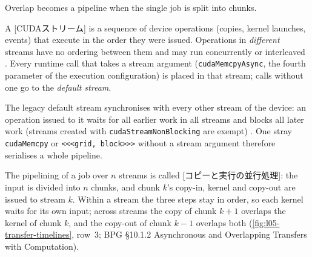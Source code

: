 \documentclass[../main.tex]{subfiles}
\begin{document}
Overlap becomes a pipeline when the single job is split into chunks.

\begin{definition}
  A [CUDAストリーム] is a sequence of device operations
  (copies, kernel launches, events) that execute in the order they were
  issued.  Operations in \emph{different} streams have no ordering
  between them and may run concurrently or interleaved
  \cite{harris2015streams}.  Every runtime call that takes a stream
  argument (\texttt{cudaMemcpyAsync}, the fourth parameter of the
  execution configuration) is placed in that stream; calls without one go
  to the \emph{default stream}.
\end{definition}

The legacy default stream synchronises with every other stream of the
device: an operation issued to it waits for all earlier work in all
streams and blocks all later work (streams created with
\texttt{cudaStreamNonBlocking} are exempt) \cite{harris2015streams}.  One stray
\texttt{cudaMemcpy} or \texttt{<<<grid, block>>>} without a stream
argument therefore serialises a whole pipeline.

\begin{definition}
  The pipelining of a job over $n$ streams is called
  [コピーと実行の並行処理]: the input is divided into $n$
  chunks, and chunk $k$'s copy-in, kernel and copy-out are issued to
  stream $k$.  Within a stream the three steps stay in order, so each
  kernel waits for its own input; across streams the copy of chunk $k+1$
  overlaps the kernel of chunk $k$, and the copy-out of chunk $k-1$
  overlaps both (\cref{fig:l05-transfer-timelines}, row~3; BPG §10.1.2
  Asynchronous and Overlapping Transfers with Computation).
\end{definition}
\end{document}
